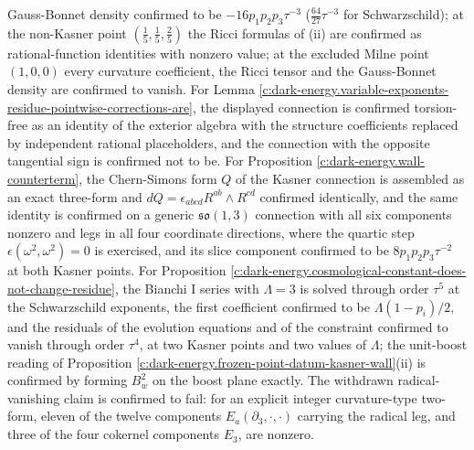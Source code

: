 \documentclass[11pt]{article}
\theoremstyle{definition}
\theoremstyle{plain}
\begin{document}
Gauss-Bonnet density confirmed to be $-16p_1p_2p_3\tau^{-3}$ ($\tfrac{64}{27}\tau^{-3}$ for Schwarzschild); at the non-Kasner point $(\tfrac15,\tfrac15,\tfrac25)$ the Ricci formulas of (ii) are confirmed as rational-function identities with nonzero value; at the excluded Milne point $(1,0,0)$ every curvature coefficient, the Ricci tensor and the Gauss-Bonnet density are confirmed to vanish. For Lemma \ref{c:dark-energy.variable-exponents-residue-pointwise-corrections-are}, the displayed connection is confirmed torsion-free as an identity of the exterior algebra with the structure coefficients replaced by independent rational placeholders, and the connection with the opposite tangential sign is confirmed not to be. For Proposition \ref{c:dark-energy.wall-counterterm}, the Chern-Simons form $Q$ of the Kasner connection is assembled as an exact three-form and $dQ = \epsilon_{abcd}R^{ab}\wedge R^{cd}$ confirmed identically, and the same identity is confirmed on a generic $\mathfrak{so}(1,3)$ connection with all six components nonzero and legs in all four coordinate directions, where the quartic step $\epsilon(\omega^2,\omega^2) = 0$ is exercised, and its slice component confirmed to be $8p_1p_2p_3\tau^{-2}$ at both Kasner points. For Proposition \ref{c:dark-energy.cosmological-constant-does-not-change-residue}, the Bianchi I series with $\Lambda = 3$ is solved through order $\tau^5$ at the Schwarzschild exponents, the first coefficient confirmed to be $\Lambda(1-p_i)/2$, and the residuals of the evolution equations and of the constraint confirmed to vanish through order $\tau^4$, at two Kasner points and two values of $\Lambda$; the unit-boost reading of Proposition \ref{c:dark-energy.frozen-point-datum-kasner-wall}(ii) is confirmed by forming $B_w^2$ on the boost plane exactly. The withdrawn radical-vanishing claim is confirmed to fail: for an explicit integer curvature-type two-form, eleven of the twelve components $E_a(\partial_3, \cdot, \cdot)$ carrying the radical leg, and three of the four cokernel components $E_3$, are nonzero.
\end{document}
